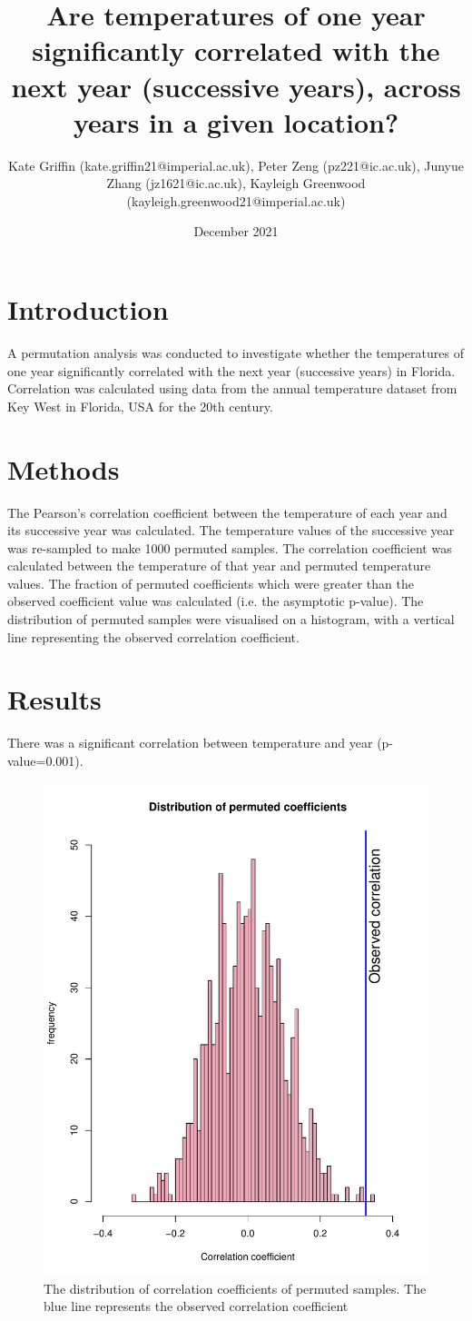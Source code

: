 \documentclass{article}
\title{Are temperatures of one year significantly correlated with the next year (successive years), across years in a given location?}
\author{Kate Griffin (kate.griffin21@imperial.ac.uk), Peter Zeng (pz221@ic.ac.uk), Junyue Zhang (jz1621@ic.ac.uk), Kayleigh Greenwood (kayleigh.greenwood21@imperial.ac.uk)}
\date{December 2021}
\begin{document}
	
	\maketitle
	
	\section{Introduction}
	A permutation analysis was conducted to investigate whether the temperatures of one year significantly correlated with the next year (successive years) in Florida. Correlation was calculated using data from the annual temperature dataset from Key West in Florida, USA for the 20th century. 
	
	\section{Methods}
	The Pearson's correlation coefficient between the temperature of each year and its successive year was calculated. The temperature values of the successive year was re-sampled to make 1000 permuted samples. The correlation coefficient was calculated between the temperature of that year and permuted temperature values. The fraction of permuted coefficients which were greater than the observed coefficient value was calculated (i.e. the asymptotic p-value). The distribution of permuted samples were visualised on a histogram, with a vertical line representing the observed correlation coefficient. 
	
	\section{Results} 
	There was a significant correlation between temperature and year (p-value=0.001). 
	\begin{figure}[H]
		\includegraphics[width= 50 mm, scale=0.31]{../results/TAutoCorr_hist.pdf}
		\caption{The distribution of correlation coefficients of permuted samples. The blue line represents the observed correlation coefficient}
		\label{The distribution of correlation coefficients of permuted samples. The blue line represents the observed correlation coefficient}
	\end{figure}
	
\end{document}
